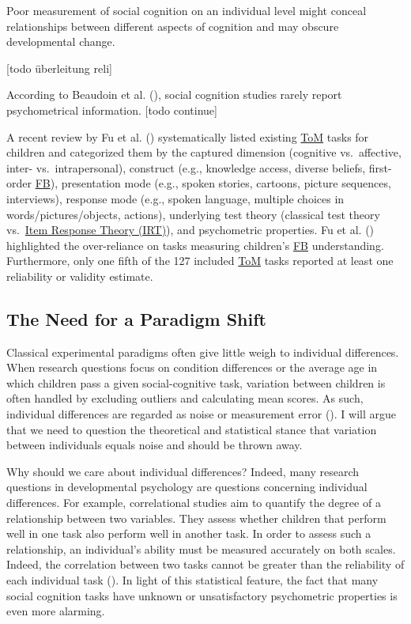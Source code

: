 \documentclass[
]{scrbook}
\begin{document}
Poor measurement of social cognition on an individual level might conceal relationships between different aspects of cognition and may obscure developmental change.

{[}todo überleitung reli{]}

According to Beaudoin et al. (), social cognition studies rarely report psychometrical information. {[}todo continue{]}

A recent review by Fu et al. () systematically listed existing \hyperref[acronyms_ToM]{ToM} tasks for children and categorized them by the captured dimension (cognitive vs.~affective, inter- vs.~intrapersonal), construct (e.g., knowledge access, diverse beliefs, first-order \hyperref[acronyms_FB]{FB}), presentation mode (e.g., spoken stories, cartoons, picture sequences, interviews), response mode (e.g., spoken language, multiple choices in words/pictures/objects, actions), underlying test theory (classical test theory vs.~\hyperref[acronyms_IRT]{Item Response Theory (IRT)}), and psychometric properties. Fu et al. () highlighted the over-reliance on tasks measuring children's \hyperref[acronyms_FB]{FB} understanding. Furthermore, only one fifth of the 127 included \hyperref[acronyms_ToM]{ToM} tasks reported at least one reliability or validity estimate.

\subsection{The Need for a Paradigm Shift}\label{the-need-for-a-paradigm-shift}

Classical experimental paradigms often give little weigh to individual differences. When research questions focus on condition differences or the average age in which children pass a given social-cognitive task, variation between children is often handled by excluding outliers and calculating mean scores. As such, individual differences are regarded as noise or measurement error (). I will argue that we need to question the theoretical and statistical stance that variation between individuals equals noise and should be thrown away.

Why should we care about individual differences? Indeed, many research questions in developmental psychology are questions concerning individual differences. For example, correlational studies aim to quantify the degree of a relationship between two variables. They assess whether children that perform well in one task also perform well in another task. In order to assess such a relationship, an individual's ability must be measured accurately on both scales. Indeed, the correlation between two tasks cannot be greater than the reliability of each individual task (). In light of this statistical feature, the fact that many social cognition tasks have unknown or unsatisfactory psychometric properties is even more alarming.
\end{document}
